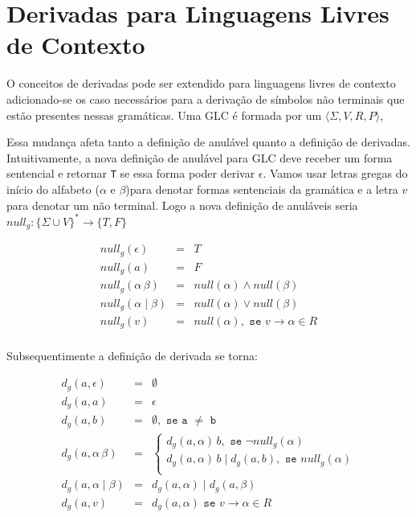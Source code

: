 \section{Derivadas para Linguagens Livres de Contexto}

O conceitos de derivadas pode ser extendido para linguagens livres de contexto adicionado-se os caso necessários para a derivação de símbolos não terminais
que estão presentes nessas gramáticas. Uma GLC é formada por um $\langle \Sigma,V,R,P \rangle$,

Essa mudança afeta tanto a definição de anulável quanto a definição de derivadas. Intuitivamente, a nova definição de
anulável para GLC deve receber um forma sentencial e retornar \texttt{T} se essa forma poder derivar $\epsilon$. Vamos usar
letras gregas do início do alfabeto ($\alpha$ e $\beta$)para denotar formas sentenciais da gramática e a letra $v$ para denotar um
não terminal. Logo a nova definição de anuláveis
seria $null_g :\{\Sigma \cup V\}^* \to \{T,F\}  $

\[
\begin{array}{lcl}
    null_g(\epsilon) & = & T\\
    null_g(a) & = & F\\
    null_g(\alpha \, \beta) & = & null(\alpha) \wedge null(\beta)\\
    null_g(\alpha \;|\; \beta) & = & null(\alpha) \vee null(\beta)\\
    null_g(v) & = & null(\alpha), \texttt{ se } v \to \alpha \in R\\
\end{array}
\]

Subsequentimente a definição de derivada se torna:

\[
\begin{array}{lcl}
d_g(a,\epsilon) & = & \emptyset\\
d_g(a,a) & = & \epsilon\\
d_g(a,b) & = & \emptyset, \texttt{ se a } \not = \texttt{ b} \\
d_g(a,\alpha \,\beta) & = & \left\{\begin{array}{l}
                               d_g(a,\alpha)\,b, \texttt{ se } \neg null_g(\alpha)\\
                               d_g(a,\alpha)\,b \;|\; d_g(a,b), \texttt{ se } null_g(\alpha)\\
                          \end{array}\right.\\
d_g(a,\alpha\;|\; \beta) & = & d_g(a,\alpha) \;|\; d_g(a,\beta) \\
d_g(a,v) & = & d_g(a,\alpha) \texttt{ se } v \to \alpha \in R\\
\end{array}
\]

